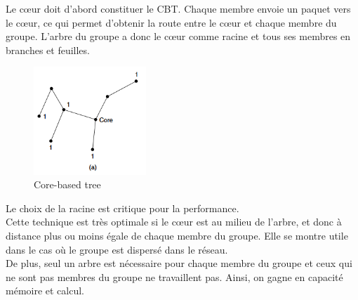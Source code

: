Le cœur doit d’abord constituer le CBT. Chaque membre envoie un paquet vers le cœur, ce qui permet d’obtenir la route entre le cœur et chaque membre du groupe. L’arbre du groupe a donc le cœur comme racine et tous ses membres en branches et feuilles.

\begin{figure}[h]
    \includegraphics[width=160px]{figures/cbt.PNG}
    \centering
    \caption{Core-based tree}
    \end{figure}

Le choix de la racine est critique pour la performance.
\\
Cette technique est très optimale si le cœur est au milieu de l’arbre, et donc à distance plus ou moins égale de chaque membre du groupe. Elle se montre utile dans le cas où le groupe est dispersé dans le réseau.
\\
De plus, seul un arbre est nécessaire pour chaque membre du groupe et ceux qui ne sont pas membres du groupe ne travaillent pas. Ainsi, on gagne en capacité mémoire et calcul.